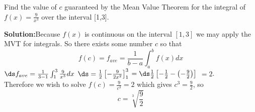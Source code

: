 \begin{frame}

\begin{example}
{Find the value of $c$ guaranteed by the Mean Value Theorem 
for the integral of $f(x)=\frac{9}{x^3}$  over the interval [1,3].}\\

\pause 

{\bf{Solution:}}Because $f(x)$ is continuous on the interval $[1,3]$ we may apply the MVT for integrals.  
So there exists some number $c$ so that 
\[
f(c)=f_{ave}=\frac{1}{b-a}\int_a^bf(x)dx
\] 
\pause 
$\ds f_{ave}=\frac{1}{3-1}\int_1^3\frac{9}{x^3}dx$
\pause
$\ds =\frac{1}{2}\left[ -\frac{9}{2x^2}\right]_1^3$
\pause
$=\ds \frac{1}{2}\left[ -\frac12-\left(-\frac92\right)\right]$
\pause
$=2$.\\

\pause
Therefore we wish to solve $f(c)=\frac{9}{c^3}=2$  \pause which gives $c^3=\frac92$, so
\[
c=\sqrt[3]{\frac{9}{2}}
\] 




\end{example}
\end{frame}


 